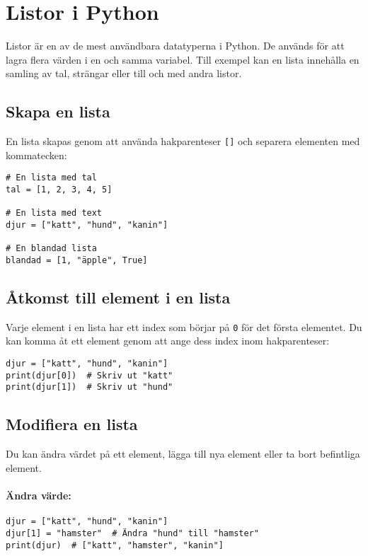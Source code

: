 \section{Listor i Python}
\label{section:lists}
Listor är en av de mest användbara datatyperna i Python. De används för att lagra flera värden i en och samma variabel. Till exempel kan en lista innehålla en samling av tal, strängar eller till och med andra listor.

\subsection{Skapa en lista}
En lista skapas genom att använda hakparenteser \texttt{[]} och separera elementen med kommatecken:
\begin{lstlisting}[title=Exempel: Skapa en lista]
# En lista med tal
tal = [1, 2, 3, 4, 5]

# En lista med text
djur = ["katt", "hund", "kanin"]

# En blandad lista
blandad = [1, "äpple", True]
\end{lstlisting}


\subsection{Åtkomst till element i en lista}
Varje element i en lista har ett index som börjar på \texttt{0} för det första elementet. Du kan komma åt ett element genom att ange dess index inom hakparenteser:
\begin{lstlisting}[title=Exempel: Åtkomst via index]
djur = ["katt", "hund", "kanin"]
print(djur[0])  # Skriv ut "katt"
print(djur[1])  # Skriv ut "hund"
\end{lstlisting}


\subsection{Modifiera en lista}
Du kan ändra värdet på ett element, lägga till nya element eller ta bort befintliga element.

\paragraph{Ändra värde:}
\begin{lstlisting}[title=Exempel: Ändra värde]
djur = ["katt", "hund", "kanin"]
djur[1] = "hamster"  # Ändra "hund" till "hamster"
print(djur)  # ["katt", "hamster", "kanin"]
\end{lstlisting}

